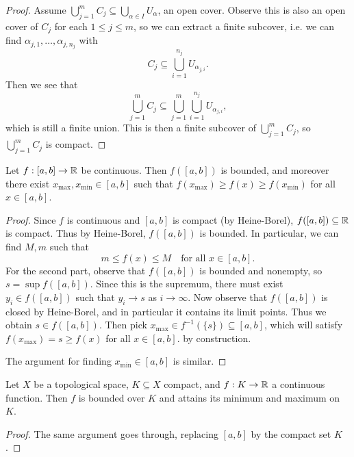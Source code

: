 \begin{proof}
  Assume $\bigcup_{j = 1}^m C_j \subseteq \bigcup_{\alpha \in I} U_\alpha$,
  an open cover. Observe this is also an open
  cover of $C_j$ for each $1 \le j \le m$, so
  we can extract a finite subcover, i.e. we can
  find $\alpha_{j, 1}, \dots, \alpha_{j, n_j}$
  with
  \[
    C_j \subseteq \bigcup_{i = 1}^{n_j} U_{\alpha_{j, i}}.
  \]
  Then we see that
  \[
    \bigcup_{j = 1}^m C_j
    \subseteq \bigcup_{j = 1}^m \bigcup_{i = 1}^{n_j} U_{\alpha_{j, i}},
  \]
  which is still a finite union. This is then a finite
  subcover of $\bigcup_{j = 1}^m C_j$, so
  $\bigcup_{j = 1}^m C_j$ is compact.
\end{proof}

\begin{theorem}[Weierstrass]
  Let $f : [a, b] \to \mathbb{R}$ be continuous. Then
  $f([a, b])$ is bounded, and moreover
  there exist $x_{\mathrm{max}}, x_{\mathrm{min}} \in [a, b]$
  such that $f(x_{\mathrm{max}}) \ge f(x) \ge f(x_{\mathrm{min}})$
  for all $x \in [a, b]$.
\end{theorem}

\begin{proof}
  Since $f$ is continuous and $[a, b]$ is compact
  (by Heine-Borel), $f([a, b]) \subseteq \mathbb{R}$ is
  compact. Thus by Heine-Borel, $f([a, b])$ is
  bounded. In particular, we can find $M, m$
  such that
  \[
    m \le f(x) \le M \quad \text{for all } x \in [a, b].
  \]
  For the second part, observe that $f([a, b])$
  is bounded and nonempty, so $s = \sup f([a, b])$.
  Since this is the supremum, there must exist
  $y_i \in f([a, b])$ such that $y_i \to s$
  as $i \to \infty$. Now observe that
  $f([a, b])$ is closed by Heine-Borel, and in
  particular it contains its limit points. Thus
  we obtain $s \in f([a, b])$. Then pick
  $x_{\mathrm{max}} \in f^{-1}(\{s\}) \subseteq [a, b]$,
  which will satisfy
  $f(x_{\mathrm{max}}) = s \ge f(x)$ for all $x \in [a, b]$.
  by construction.

  The argument for finding
  $x_{\mathrm{min}} \in [a, b]$ is similar.
\end{proof}

\begin{theorem}
  Let $X$ be a topological space, $K \subseteq X$
  compact, and $f : K \to \mathbb{R}$ a continuous function.
  Then $f$ is bounded over $K$
  and attains its minimum and maximum on $K$.
\end{theorem}

\begin{proof}
  The same argument goes through, replacing
  $[a, b]$ by the compact set $K$.
\end{proof}
